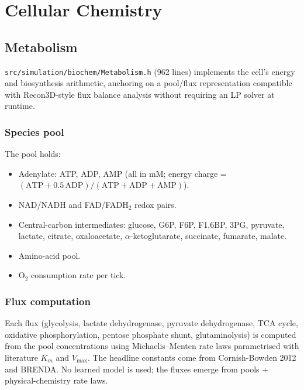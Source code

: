 \documentclass[11pt,letterpaper,twoside,openany]{book}
\newcommand{\file}[1]{\texttt{\small#1}}
\begin{document}
\part{Cellular Chemistry}

\chapter{Metabolism}
\label{ch:metabolism}

\file{src/simulation/biochem/Metabolism.h} (962 lines) implements the
cell's energy and biosynthesis arithmetic, anchoring on a
pool/flux representation compatible with Recon3D-style flux balance
analysis without requiring an LP solver at runtime.

\section{Species pool}

The pool holds:
\begin{itemize}
  \item Adenylate: ATP, ADP, AMP (all in mM; energy charge = $(\text{ATP} + 0.5\,\text{ADP})/(\text{ATP}+\text{ADP}+\text{AMP})$).
  \item NAD/NADH and FAD/FADH\(_2\) redox pairs.
  \item Central-carbon intermediates: glucose, G6P, F6P, F1,6BP, 3PG, pyruvate, lactate, citrate, oxaloacetate, $\alpha$-ketoglutarate, succinate, fumarate, malate.
  \item Amino-acid pool.
  \item O\(_2\) consumption rate per tick.
\end{itemize}

\section{Flux computation}

Each flux (glycolysis, lactate dehydrogenase, pyruvate dehydrogenase,
TCA cycle, oxidative phosphorylation, pentose phosphate shunt,
glutaminolysis) is computed from the pool concentrations using
Michaelis--Menten rate laws parametrised with literature $K_m$ and
$V_\text{max}$. The headline constants come from Cornish-Bowden
2012 and BRENDA. No learned model is used; the fluxes emerge from
pools + physical-chemistry rate laws.
\end{document}
